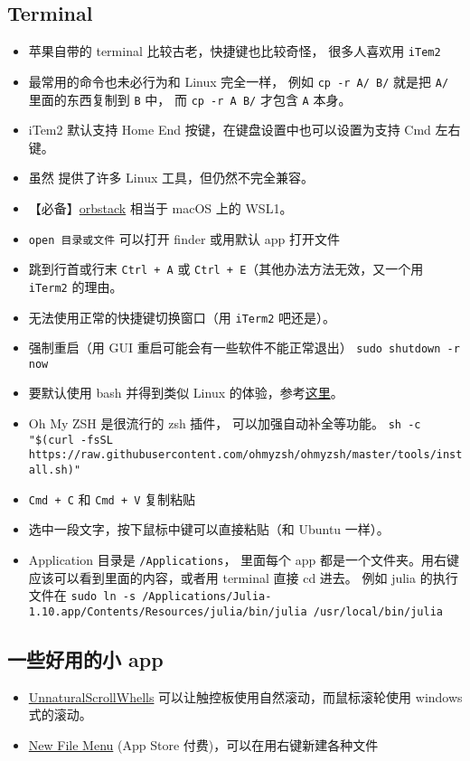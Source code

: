 \subsection{Terminal}
\begin{itemize}
\item 苹果自带的 terminal 比较古老，快捷键也比较奇怪， 很多人喜欢用 \verb`iTem2`
\item 最常用的命令也未必行为和 Linux 完全一样， 例如 \verb`cp -r A/ B/` 就是把 \verb`A/` 里面的东西复制到 \verb`B` 中， 而 \verb`cp -r A B/` 才包含 \verb`A` 本身。
\item iTem2 默认支持 Home End 按键，在键盘设置中也可以设置为支持 Cmd 左右键。
\item 虽然  提供了许多 Linux 工具，但仍然不完全兼容。
\item 【必备】\href{https://orbstack.dev/}{orbstack} 相当于 macOS 上的 WSL1。
\item \verb`open 目录或文件` 可以打开 finder 或用默认 app 打开文件
\item 跳到行首或行末 \verb`Ctrl + A` 或 \verb`Ctrl + E`（其他办法方法无效，又一个用 \verb`iTerm2` 的理由。
\item 无法使用正常的快捷键切换窗口（用 \verb`iTerm2` 吧还是）。
\item 强制重启（用 GUI 重启可能会有一些软件不能正常退出） \verb`sudo shutdown -r now`
\item 要默认使用 bash 并得到类似 Linux 的体验，参考\href{https://medium.com/@geraldcroes/the-good-tweak-the-bad-mac-and-the-ugly-terminal-8f18b3c3d687}{这里}。
\item Oh My ZSH 是很流行的 zsh 插件， 可以加强自动补全等功能。 \verb`sh -c "$(curl -fsSL https://raw.githubusercontent.com/ohmyzsh/ohmyzsh/master/tools/install.sh)"`
\item \verb`Cmd + C` 和 \verb`Cmd + V` 复制粘贴
\item 选中一段文字，按下鼠标中键可以直接粘贴（和 Ubuntu 一样）。
\item Application 目录是 \verb`/Applications`， 里面每个 app 都是一个文件夹。用右键应该可以看到里面的内容，或者用 terminal 直接 cd 进去。 例如 julia 的执行文件在 \verb`sudo ln -s /Applications/Julia-1.10.app/Contents/Resources/julia/bin/julia /usr/local/bin/julia`
\end{itemize}

\subsection{一些好用的小 app}
\begin{itemize}
\item \href{https://github.com/ther0n/UnnaturalScrollWheels}{UnnaturalScrollWhells} 可以让触控板使用自然滚动，而鼠标滚轮使用 windows 式的滚动。
\item \href{https://apps.apple.com/us/app/new-file-menu/id1064959555?mt=12}{New File Menu} (App Store 付费)，可以在用右键新建各种文件
\end{itemize}

